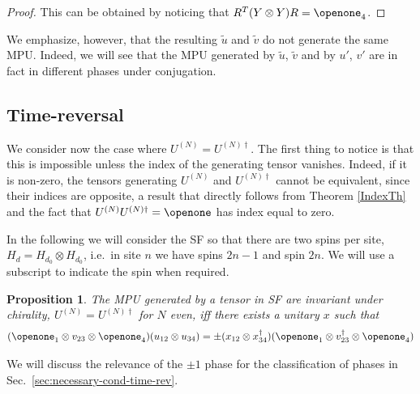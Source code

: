 \documentclass[pra,twocolumn,nofootinbib,superscriptaddress]{revtex4-1}
\def\Id{{\openone}}
\newtheorem{prop}[thm]{Proposition}
\begin{document}
\begin{proof}
	This can be obtained by noticing that $R^T(Y\otimes Y)R=\openone_4$.
\end{proof}

We emphasize, however, that the resulting ${\tilde u}$ and ${\tilde v}$ do
not generate the same MPU.  Indeed, we will see that the MPU generated by
$\tilde{u}$, $\tilde{v}$ and by $u'$, $v'$ are in fact in different
phases under conjugation.




\subsection{Time-reversal}




We consider now the case where $U^{(N)} = U^{(N)\dagger}$. The first thing
to notice is that this is impossible unless the index of the
generating tensor vanishes. Indeed, if it is non-zero, the tensors
generating $U^{(N)}$ and $U^{(N)\dagger}$ cannot be equivalent, since
their indices are opposite, a result that directly follows from Theorem
\ref{IndexTh} and the fact that $U^{(N)}U^{(N)\dagger}=\Id$ has index
equal to zero.

In the following we will consider the SF so that there are two spins per
site, $H_d=H_{d_0}\otimes H_{d_0}$, i.e.\ in site $n$ we have spins
$2n-1$ and spin $2n$.  We will use a subscript to indicate the spin when
required.

\begin{prop}
	\label{PropChiral}
	The MPU generated by a tensor in SF are invariant under chirality,
	$U^{(N)}=U^{(N)\dagger}$ for $N$ even, iff there exists a unitary $x$ such
	that
	\begin{equation}
		\label{UUdaggertrick}
		(\Id_1\otimes v_{23} \otimes \Id_4)(u_{12}\otimes u_{34})=
		\pm
		(x_{12}\otimes x_{34}^\dagger) (\Id_1\otimes v_{23}^\dagger \otimes \Id_4)
	\end{equation}
\end{prop}
\noindent
We will discuss the relevance of the $\pm1 $ phase for the classification
of phases in Sec.~\ref{sec:necessary-cond-time-rev}.
\end{document}
